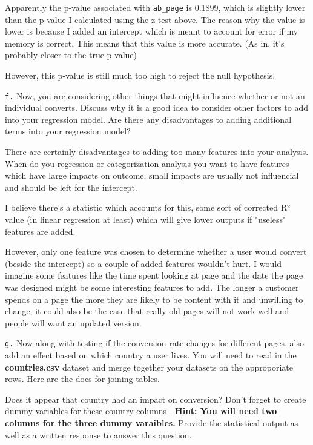 \documentclass[11pt]{article}
\begin{document}
    Apparently the p-value associated with \texttt{ab\_page} is 0.1899,
which is slightly lower than the p-value I calculated using the z-test
above. The reason why the value is lower is because I added an intercept
which is meant to account for error if my memory is correct. This means
that this value is more accurate. (As in, it's probably closer to the
true p-value)

However, this p-value is still much too high to reject the null
hypothesis.

    \texttt{f.} Now, you are considering other things that might influence
whether or not an individual converts. Discuss why it is a good idea to
consider other factors to add into your regression model. Are there any
disadvantages to adding additional terms into your regression model?

    There are certainly disadvantages to adding too many features into your
analysis. When do you regression or categorization analysis you want to
have features which have large impacts on outcome, small impacts are
usually not influencial and should be left for the intercept.

I believe there's a statistic which accounts for this, some sort of
corrected R² value (in linear regression at least) which will give lower
outputs if "useless" features are added.

However, only one feature was chosen to determine whether a user would
convert (beside the intercept) so a couple of added features wouldn't
hurt. I would imagine some features like the time spent looking at page
and the date the page was designed might be some interesting features to
add. The longer a customer spends on a page the more they are likely to
be content with it and unwilling to change, it could also be the case
that really old pages will not work well and people will want an updated
version.

    \texttt{g.} Now along with testing if the conversion rate changes for
different pages, also add an effect based on which country a user lives.
You will need to read in the \textbf{countries.csv} dataset and merge
together your datasets on the approporiate rows.
\href{https://pandas.pydata.org/pandas-docs/stable/generated/pandas.DataFrame.join.html}{Here}
are the docs for joining tables.

Does it appear that country had an impact on conversion? Don't forget to
create dummy variables for these country columns - \textbf{Hint: You
will need two columns for the three dummy varaibles.} Provide the
statistical output as well as a written response to answer this
question.
\end{document}
